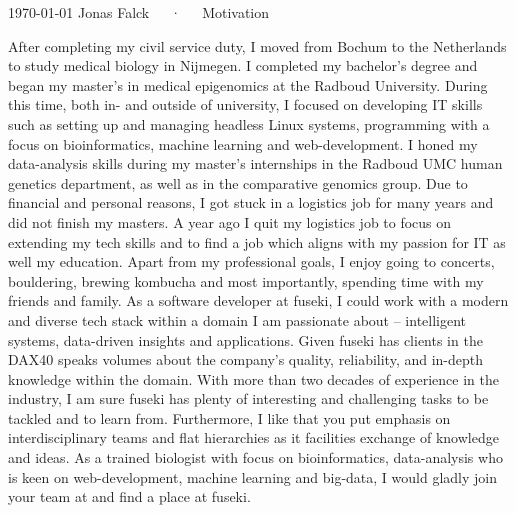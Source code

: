 \documentclass[11pt, a4paper]{awesome-cv}
\begin{document}
\makecvheader[R]

\makecvfooter
  {\today}
  {Jonas Falck~~~·~~~Motivation}
  {}

\makelettertitle
\begin{cvletter}

After completing my civil service duty, I moved from Bochum to the Netherlands to study medical biology in Nijmegen. 
I completed my bachelor’s degree and began my master's in medical epigenomics at the Radboud University. 
During this time, both in- and outside of university, I focused on developing IT skills such as setting up and managing headless Linux systems, programming with a focus on bioinformatics, machine learning and web-development. 
I honed my data-analysis skills during my master's internships in the Radboud UMC human genetics department, as well as in the comparative genomics group. 
Due to financial and personal reasons, I got stuck in a logistics job for many years and did not finish my masters.
A year ago I quit my logistics job to focus on extending my tech skills and to find a job which aligns with my passion for IT as well my education.
Apart from my professional goals, I enjoy going to concerts, bouldering, brewing kombucha and most importantly, spending time with my friends and family.
As a software developer at fuseki, I could work with a modern and diverse tech stack within a domain I am passionate about – intelligent systems, data-driven insights and applications. 
Given fuseki has clients in the DAX40 speaks volumes about the company's quality, reliability, and in-depth knowledge within the domain.
With more than two decades of experience in the industry, I am sure fuseki has plenty of interesting and challenging tasks to be tackled and to learn from.
Furthermore, I like that you put emphasis on interdisciplinary teams and flat hierarchies as it facilities exchange of knowledge and ideas. 
As a trained biologist with focus on bioinformatics, data-analysis who is keen on web-development, machine learning and big-data, I would gladly join your team at and find a place at fuseki.

\end{cvletter}
\end{document}
